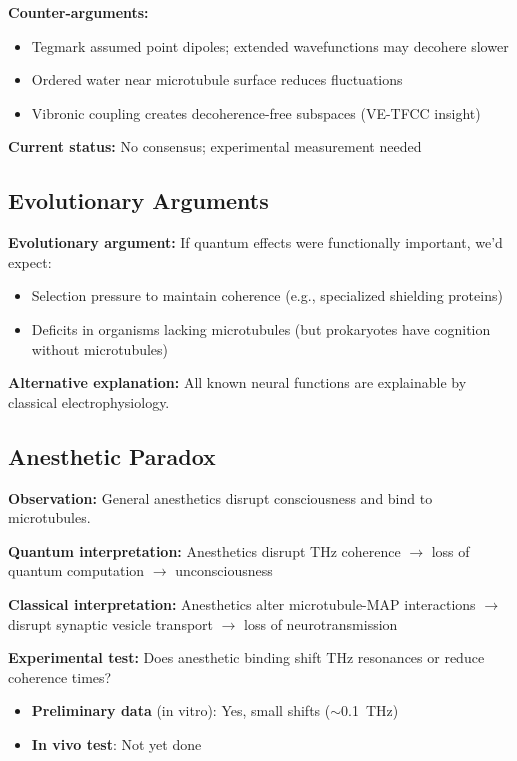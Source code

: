 \textbf{Counter-arguments:}
\begin{itemize}
\item Tegmark assumed point dipoles; extended wavefunctions may decohere slower
\item Ordered water near microtubule surface reduces fluctuations
\item Vibronic coupling creates decoherence-free subspaces (VE-TFCC insight)
\end{itemize}

\textbf{Current status:} No consensus; experimental measurement needed

\subsection{Evolutionary Arguments}\label{evolutionary-arguments}

\textbf{Evolutionary argument:} If quantum effects were functionally important, we'd expect:
\begin{itemize}
\item Selection pressure to maintain coherence (e.g., specialized shielding proteins)
\item Deficits in organisms lacking microtubules (but prokaryotes have cognition without microtubules)
\end{itemize}

\textbf{Alternative explanation:} All known neural functions are explainable by classical electrophysiology.

\subsection{Anesthetic Paradox}\label{anesthetic-paradox}

\textbf{Observation:} General anesthetics disrupt consciousness and bind to microtubules.

\textbf{Quantum interpretation:} Anesthetics disrupt THz coherence $\rightarrow$ loss of quantum computation $\rightarrow$ unconsciousness

\textbf{Classical interpretation:} Anesthetics alter microtubule-MAP interactions $\rightarrow$ disrupt synaptic vesicle transport $\rightarrow$ loss of neurotransmission

\textbf{Experimental test:} Does anesthetic binding shift THz resonances or reduce coherence times?
\begin{itemize}
\item \textbf{Preliminary data} (in vitro): Yes, small shifts ($\sim$0.1~THz)
\item \textbf{In vivo test}: Not yet done
\end{itemize}

